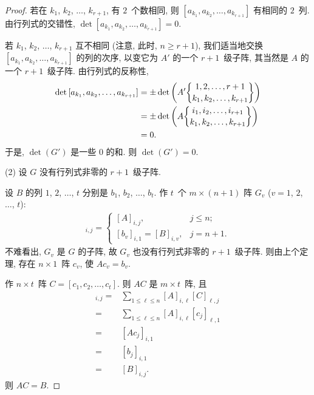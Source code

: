 \documentclass[../libro.tex]{subfiles}
\begin{document}
\begin{proof}
    若在 \(k_1\), \(k_2\), \(\dots\), \(k_{r+1}\),
    有 \(2\)~个数相同,
    则 \([a_{k_1}, a_{k_2}, \dots, a_{k_{r+1}}]\)
    有相同的 \(2\)~列.
    由行列式的交错性,
    \(\det {[a_{k_1}, a_{k_2}, \dots, a_{k_{r+1}}]} = 0\).

    若 \(k_1\), \(k_2\), \(\dots\), \(k_{r+1}\)
    互不相同
    (注意, 此时, \(n \geq r+1\)),
    我们适当地交换
    \([a_{k_1}, a_{k_2}, \dots, a_{k_{r+1}}]\)
    的列的次序,
    以变它为 \(A'\) 的一个 \(r+1\)~级子阵,
    其当然是 \(A\) 的一个 \(r+1\)~级子阵.
    由行列式的反称性,
    \begin{align*}
        \det {[a_{k_1}, a_{k_2}, \dots, a_{k_{r+1}}]}
        = {} &
        {\pm
            \det {\left(
                    A'\submat{1,2,\dots,r+1}{k_1,k_2,\dots,k_{r+1}}
        \right)}}
        \\
        = {} &
        {\pm
            \det {\left(
                    A\submat{i_1,i_2,\dots,i_{r+1}}{k_1,k_2,\dots,k_{r+1}}
        \right)}}
        \\
        = {} &
        0.
    \end{align*}
    于是, \(\det {(G')}\) 是一些 \(0\) 的和.
    则 \(\det {(G')} = 0\).

    (2)
    设 \(G\) 没有行列式非零的 \(r + 1\)~级子阵.

    设 \(B\) 的列
    \(1\), \(2\), \(\dots\), \(t\)
    分别是 \(b_1\), \(b_2\), \(\dots\), \(b_t\).
    作 \(t\)~个 \(m \times (n + 1)\) 阵 \(G_v\)
    (\(v = 1\), \(2\), \(\dots\), \(t\)):
    \begin{align*}
        [G_v]_{i,j} =
        \begin{cases}
            [A]_{i,j},               & j \leq n;  \\
            [b_v]_{i,1} = [B]_{i,v}, & j = n + 1.
        \end{cases}
    \end{align*}
    不难看出, \(G_v\) 是 \(G\) 的子阵,
    故 \(G_v\) 也没有行列式非零的 \(r + 1\)~级子阵.
    则由上个定理, 存在 \(n \times 1\)~阵 \(c_v\),
    使 \(A c_v = b_v\).

    作 \(n \times t\)~阵
    \(C = [c_1, c_2, \dots, c_t]\).
    则 \(A C\) 是 \(m \times t\)~阵,
    且
    \begin{align*}
        [A C]_{i,j}
        = {} &
        \sum_{1 \leq \ell \leq n}
        {[A]_{i,\ell} [C]_{\ell,j}}
        \\
        = {} &
        \sum_{1 \leq \ell \leq n}
        {[A]_{i,\ell} [c_j]_{\ell,1}}
        \\
        = {} &
        [A c_j]_{i,1}
        \\
        = {} &
        [b_j]_{i,1}
        \\
        = {} &
        [B]_{i,j}.
    \end{align*}
    则 \(A C = B\).


\end{proof}
\end{document}
